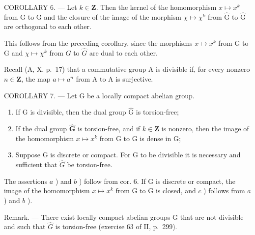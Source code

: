 COROLLARY 6. --- Let \(k \in \mathbf{Z}\). Then the kernel of the homomorphism \(x \mapsto x^k\) from G to G and the closure of the image of the morphism \(\chi \mapsto \chi^k\) from \(\widehat{\mathrm{G}}\) to \(\widehat{\mathrm{G}}\) are orthogonal to each other.

This follows from the preceding corollary, since the morphisms \(x \mapsto x^{k}\) from G to G and \(\chi \mapsto \chi^{k}\) from \(\widehat{G}\) to \(\widehat{G}\) are dual to each other.

Recall (A, X, p.~17) that a commutative group A is divisible if, for every nonzero \(n \in \mathbf{Z}\), the map \(a \mapsto a^n\) from A to A is surjective.

COROLLARY 7. --- Let G be a locally compact abelian group.

\begin{enumerate}
\def\labelenumi{\alph{enumi})}
\item
  If G is divisible, then the dual group \(\widehat{\mathrm{G}}\) is torsion-free;
\item
  If the dual group \(\widehat{\mathbf{G}}\) is torsion-free, and if \(k\in\mathbf{Z}\) is nonzero, then the image of the homomorphism \(x\mapsto x^{k}\) from G to G is dense in G;
\item
  Suppose G is discrete or compact. For G to be divisible it is necessary and sufficient that \(\widehat{G}\) be torsion-free.
\end{enumerate}

The assertions \(a\) ) and \(b\) ) follow from cor. 6. If G is discrete or compact, the image of the homomorphism \(x \mapsto x^k\) from G to G is closed, and \(c\) ) follows from \(a\) ) and \(b\) ).

Remark. --- There exist locally compact abelian groups G that are not divisible and such that \(\widehat{G}\) is torsion-free (exercise 63 of II, p.~299).

